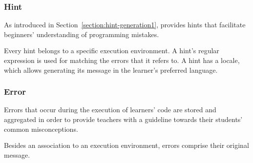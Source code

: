 \subsubsection{Hint}

As introduced in Section~\ref{section:hint-generation1}, \tool provides hints that facilitate beginners' understanding of programming mistakes.

Every hint belongs to a specific execution environment. A hint's regular expression is used for matching the errors that it refers to. A hint has a locale, which allows generating its message in the learner's preferred language.

\subsubsection{Error}

\enlargethispage{\baselineskip}

Errors that occur during the execution of learners' code are stored and aggregated in order to provide teachers with a guideline towards their students' common misconceptions.

Besides an association to an execution environment, errors comprise their original message.
